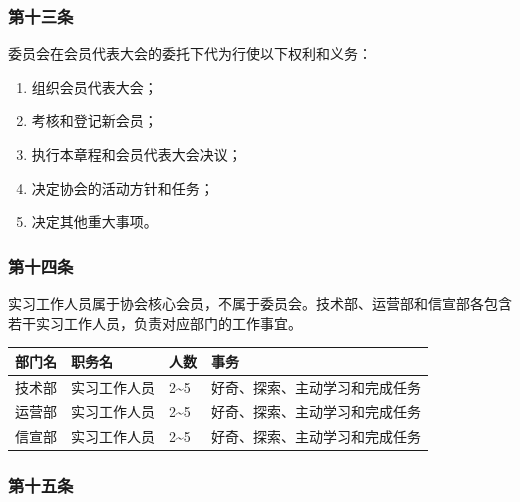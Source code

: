 \documentclass[
]{ctexart}
\begin{document}
\hypertarget{ux7b2cux5341ux4e09ux6761-ux59d4ux5458ux4f1aux7684ux6743ux5229ux548cux4e49ux52a1}{%
\subsubsection{第十三条}\label{ux7b2cux5341ux4e09ux6761-ux59d4ux5458ux4f1aux7684ux6743ux5229ux548cux4e49ux52a1}}

委员会在会员代表大会的委托下代为行使以下权利和义务：

\begin{enumerate}
\def\labelenumi{\arabic{enumi}.}
\item
  组织会员代表大会；
\item
  考核和登记新会员；
\item
  执行本章程和会员代表大会决议；
\item
  决定协会的活动方针和任务；
\item
  决定其他重大事项。
\end{enumerate}

\hypertarget{ux7b2cux5341ux56dbux6761-ux5b9eux4e60ux5de5ux4f5cux4ebaux5458}{%
\subsubsection{第十四条}\label{ux7b2cux5341ux56dbux6761-ux5b9eux4e60ux5de5ux4f5cux4ebaux5458}}

实习工作人员属于协会核心会员，不属于委员会。技术部、运营部和信宣部各包含若干实习工作人员，负责对应部门的工作事宜。

\begin{longtable}[]{@{}llll@{}}
\toprule()
\textbf{部门名} & \textbf{职务名} & \textbf{人数} & \textbf{事务} \\
\midrule()
\endhead
技术部 & 实习工作人员 & 2\textasciitilde 5 &
好奇、探索、主动学习和完成任务 \\
运营部 & 实习工作人员 & 2\textasciitilde 5 &
好奇、探索、主动学习和完成任务 \\
信宣部 & 实习工作人员 & 2\textasciitilde 5 &
好奇、探索、主动学习和完成任务 \\
\bottomrule()
\end{longtable}

\hypertarget{ux7b2cux5341ux4e94ux6761-ux534fux4f1aux4e0bux5c5eux7ec4ux7ec7}{%
\subsubsection{第十五条}\label{ux7b2cux5341ux4e94ux6761-ux534fux4f1aux4e0bux5c5eux7ec4ux7ec7}}
\end{document}
